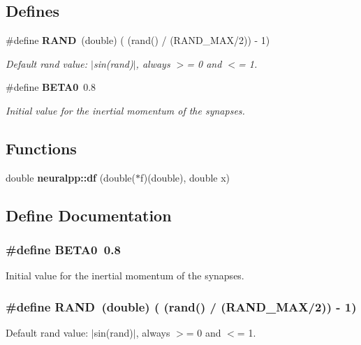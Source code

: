 \subsection*{Defines}
\begin{CompactItemize}
\item 
\#define {\bf RAND}~(double) ( (rand() / (RAND\_\-MAX/2)) - 1)
\begin{CompactList}\small\item\em Default rand value: $|$sin(rand)$|$, always $>$= 0 and $<$= 1. \item\end{CompactList}\item 
\#define {\bf BETA0}~0.8
\begin{CompactList}\small\item\em Initial value for the inertial momentum of the synapses. \item\end{CompactList}\end{CompactItemize}
\subsection*{Functions}
\begin{CompactItemize}
\item 
double {\bf neuralpp::df} (double($\ast$f)(double), double x)
\end{CompactItemize}


\subsection{Define Documentation}
\subsubsection[BETA0]{\setlength{\rightskip}{0pt plus 5cm}\#define BETA0~0.8}\label{neural_09_09_8hpp_05e2bb5b9fc32f0b6b4d84fe43177d72}


Initial value for the inertial momentum of the synapses. 

\subsubsection[RAND]{\setlength{\rightskip}{0pt plus 5cm}\#define RAND~(double) ( (rand() / (RAND\_\-MAX/2)) - 1)}\label{neural_09_09_8hpp_839a9222721835f53c5b248241f535f4}


Default rand value: $|$sin(rand)$|$, always $>$= 0 and $<$= 1. 

